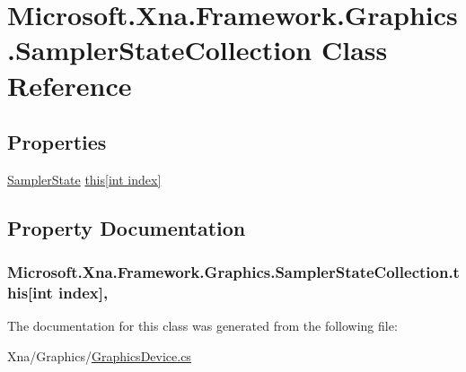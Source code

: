\hypertarget{class_microsoft_1_1_xna_1_1_framework_1_1_graphics_1_1_sampler_state_collection}{}\section{Microsoft.\+Xna.\+Framework.\+Graphics.\+Sampler\+State\+Collection Class Reference}
\label{class_microsoft_1_1_xna_1_1_framework_1_1_graphics_1_1_sampler_state_collection}
\subsection*{Properties}
\begin{DoxyCompactItemize}
\item 
\hyperlink{class_microsoft_1_1_xna_1_1_framework_1_1_graphics_1_1_sampler_state}{Sampler\+State} \hyperlink{class_microsoft_1_1_xna_1_1_framework_1_1_graphics_1_1_sampler_state_collection_aad6809672a5c1255ab9770b0bde48695}{this\mbox{[}int index\mbox{]}}
\end{DoxyCompactItemize}


\subsection{Property Documentation}
\hypertarget{class_microsoft_1_1_xna_1_1_framework_1_1_graphics_1_1_sampler_state_collection_aad6809672a5c1255ab9770b0bde48695}{}
\subsubsection[{this[int index]}]{ Microsoft.\+Xna.\+Framework.\+Graphics.\+Sampler\+State\+Collection.\+this\mbox{[}int index\mbox{]}\hspace{0.3cm}{\ttfamily [get]}, {\ttfamily [set]}}\label{class_microsoft_1_1_xna_1_1_framework_1_1_graphics_1_1_sampler_state_collection_aad6809672a5c1255ab9770b0bde48695}


The documentation for this class was generated from the following file\+:\begin{DoxyCompactItemize}
\item 
Xna/\+Graphics/\hyperlink{_graphics_device_8cs}{Graphics\+Device.\+cs}\end{DoxyCompactItemize}
